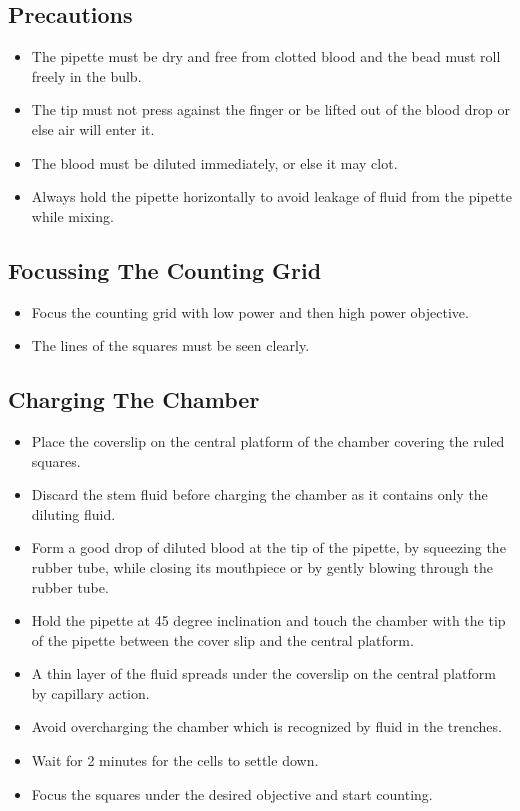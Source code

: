 \documentclass[a4paper,12pt]{book}
\begin{document}
					\subsection*{Precautions}
					\begin{itemize}

						\item{The pipette must be dry and free from clotted blood and the bead must roll freely in the bulb.}
						\item{The tip must not press against the finger or be lifted out of the blood drop or else air will enter it.}
						\item{The blood must be diluted immediately, or else it may clot.}
						\item{Always hold the pipette horizontally to avoid leakage of fluid from the pipette while mixing.}

					\end{itemize}


					\subsection*{Focussing The Counting Grid}
					\begin{itemize}

						\item{	Focus the counting grid with low power and then high power objective.}
						\item{	The lines of the squares must be seen clearly.}
					\end{itemize}

					\subsection*{Charging The Chamber}
					\begin{itemize}

						\item{	 Place the coverslip on the central platform of the chamber covering the ruled squares.}
						\item{	 Discard the stem fluid before charging the chamber as it contains only the diluting fluid.}
						\item{	 Form a good drop of diluted blood at the tip of the pipette, by squeezing the rubber tube, while closing its mouthpiece or by gently blowing through the rubber tube.}
						\item{	 Hold the pipette at 45 degree inclination and touch the chamber with the  tip of the pipette between the cover slip and the central platform.}
						\item{	 A thin layer of the fluid spreads under the coverslip on the central  platform by capillary action.}
						\item{	 Avoid overcharging the chamber which is recognized by fluid in the  trenches.}
						\item{	 Wait for 2 minutes for the cells to settle down.}
						\item{	 Focus  the  squares  under  the  desired  objective  and  start  counting.}
					\end{itemize}
\end{document}
